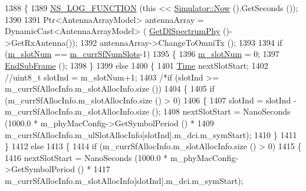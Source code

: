 \begin{DoxyCode}
1388 \{
1389         \hyperlink{log-macros-disabled_8h_a90b90d5bad1f39cb1b64923ea94c0761}{NS\_LOG\_FUNCTION} (\textcolor{keyword}{this} << \hyperlink{classns3_1_1Simulator_ac3178fa975b419f7875e7105be122800}{Simulator::Now} ().GetSeconds ());
1390 
1391         Ptr<AntennaArrayModel> antennaArray = DynamicCast<AntennaArrayModel> (
      \hyperlink{classns3_1_1MmWaveEnbPhy_a1fd12ed3e1da54288cf17a1bb9bcdf74}{GetDlSpectrumPhy} ()->GetRxAntenna());
1392         antennaArray->ChangeToOmniTx ();
1393 
1394         \textcolor{keywordflow}{if} (\hyperlink{classns3_1_1MmWavePhy_a6c83cdb8c36a9a58ae8b9f17933680ac}{m\_slotNum} == \hyperlink{classns3_1_1MmWaveEnbPhy_a009230227393f4585df5440133f1a52b}{m\_currSfNumSlots}-1)
1395         \{
1396                 \hyperlink{classns3_1_1MmWavePhy_a6c83cdb8c36a9a58ae8b9f17933680ac}{m\_slotNum} = 0;
1397                 \hyperlink{classns3_1_1MmWaveEnbPhy_aac9be87981341e7a6e303ad5d05316a1}{EndSubFrame} ();
1398         \}
1399         \textcolor{keywordflow}{else}
1400         \{
1401                 \hyperlink{namespacens3_1_1TracedValueCallback_a7ffd3e7c142ffe7c8a1d2db9b8de38ec}{Time} nextSlotStart;
1402                 \textcolor{comment}{//uint8\_t slotInd = m\_slotNum+1;}
1403                 \textcolor{comment}{/*if (slotInd >= m\_currSfAllocInfo.m\_slotAllocInfo.size ())}
1404 \textcolor{comment}{                \{}
1405 \textcolor{comment}{                        if (m\_currSfAllocInfo.m\_slotAllocInfo.size () > 0)}
1406 \textcolor{comment}{                        \{}
1407 \textcolor{comment}{                                slotInd = slotInd - m\_currSfAllocInfo.m\_slotAllocInfo.size ();}
1408 \textcolor{comment}{                                nextSlotStart = NanoSeconds (1000.0 * m\_phyMacConfig->GetSymbolPeriod () *}
1409 \textcolor{comment}{                                                            
       m\_currSfAllocInfo.m\_ulSlotAllocInfo[slotInd].m\_dci.m\_symStart);}
1410 \textcolor{comment}{                        \}}
1411 \textcolor{comment}{                \}}
1412 \textcolor{comment}{                else}
1413 \textcolor{comment}{                \{}
1414 \textcolor{comment}{                        if (m\_currSfAllocInfo.m\_slotAllocInfo.size () > 0)}
1415 \textcolor{comment}{                        \{}
1416 \textcolor{comment}{                                nextSlotStart = NanoSeconds (1000.0 * m\_phyMacConfig->GetSymbolPeriod () *}
1417 \textcolor{comment}{                                                            
       m\_currSfAllocInfo.m\_slotAllocInfo[slotInd].m\_dci.m\_symStart);}

\end{DoxyCode}
